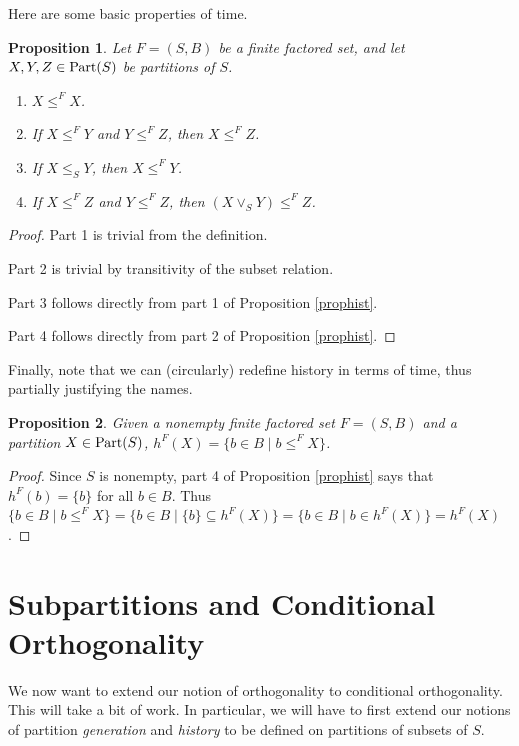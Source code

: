 \documentclass[authordate,onecolumn]{miri-tech-article}
\newtheorem{proposition}{Proposition}
\begin{document}
Here are some basic properties of time.
\begin{proposition}
Let $F=(S,B)$ be a finite factored set, and let $X,Y,Z\in \text{Part}(S)$ be partitions of $S$.
\begin{enumerate}    
    \item $X\leq^F X$.
    \item If $X\leq^F Y$ and $Y\leq^F Z$, then $X\leq^F Z$.
    \item If $X\leq_S Y$, then $X\leq^F Y$.
    \item If $X\leq^F Z$ and $Y\leq^F Z$, then $(X\vee_S Y)\leq^F Z$.
\end{enumerate}
\end{proposition}
\begin{proof}
Part 1 is trivial from the definition.

Part 2 is trivial by transitivity of the subset relation.

Part 3 follows directly from part 1 of Proposition \ref{prophist}.

Part 4 follows directly from part 2 of Proposition \ref{prophist}.
\end{proof}
Finally, note that we can (circularly) redefine history in terms of time, thus partially justifying the names.
\begin{proposition}
Given a nonempty finite factored set $F=(S,B)$ and a partition $X\in \text{Part}(S)$, $h^F(X)=\{b\in B\mid b\leq^F X\}$.
\end{proposition}
\begin{proof}
Since $S$ is nonempty, part 4 of Proposition \ref{prophist} says that $h^F(b)=\{b\}$ for all $b\in B$. Thus $\{b\in B\mid b\leq^F X\}=\{b\in B\mid \{b\} \subseteq h^F(X)\}=\{b\in B\mid b \in h^F(X)\}=h^F(X)$.
\end{proof}

\section{Subpartitions and Conditional Orthogonality}

We now want to extend our notion of orthogonality to conditional orthogonality. This will take a bit of work. In particular, we will have to first extend our notions of partition \emph{generation} and \emph{history} to be defined on partitions of subsets of $S$.
\end{document}
